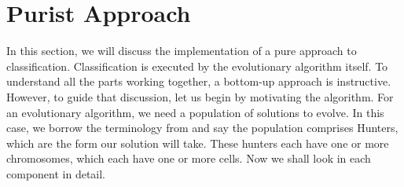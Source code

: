 \section{Purist Approach}
In this section, we will discuss the implementation of a pure approach to classification.  Classification is executed by the evolutionary algorithm itself.  To understand all the parts working together, a bottom-up approach is instructive.  However, to guide that discussion, let us begin by motivating the algorithm.
For an evolutionary algorithm, we need a population of solutions to evolve.  In this case, we borrow the terminology from \cite{kharma_project_2004} and say the population comprises Hunters, which are the form our solution will take.  These hunters each have one or more chromosomes, which each have one or more cells.  Now we shall look in each component in detail.
